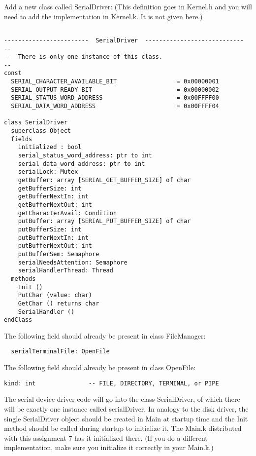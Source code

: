 \documentclass[11pt]{article}
\begin{document}
Add a new class called SerialDriver: (This definition goes in Kernel.h
and you will need to add the implementation in Kernel.k.  It is not
given here.)

\begin{verbatim}

------------------------  SerialDriver  ----------------------------
--
--  There is only one instance of this class.
--
const
  SERIAL_CHARACTER_AVAILABLE_BIT                 = 0x00000001
  SERIAL_OUTPUT_READY_BIT                        = 0x00000002
  SERIAL_STATUS_WORD_ADDRESS                     = 0x00FFFF00
  SERIAL_DATA_WORD_ADDRESS                       = 0x00FFFF04

class SerialDriver
  superclass Object
  fields
    initialized : bool
    serial_status_word_address: ptr to int
    serial_data_word_address: ptr to int
    serialLock: Mutex
    getBuffer: array [SERIAL_GET_BUFFER_SIZE] of char
    getBufferSize: int
    getBufferNextIn: int
    getBufferNextOut: int
    getCharacterAvail: Condition
    putBuffer: array [SERIAL_PUT_BUFFER_SIZE] of char
    putBufferSize: int
    putBufferNextIn: int
    putBufferNextOut: int
    putBufferSem: Semaphore
    serialNeedsAttention: Semaphore
    serialHandlerThread: Thread
  methods
    Init ()
    PutChar (value: char)
    GetChar () returns char
    SerialHandler ()
endClass
\end{verbatim}

The following field should already be present in class FileManager:

\begin{verbatim}
  serialTerminalFile: OpenFile
\end{verbatim}

The following field should already be present in class OpenFile:

\begin{verbatim}
kind: int               -- FILE, DIRECTORY, TERMINAL, or PIPE
\end{verbatim}

The serial device driver code will go into the class SerialDriver, of
which there will be exactly one instance called serialDriver.  In
analogy to the disk driver, the single SerialDriver object should be
created in Main at startup time and the Init method should be called
during startup to initialize it.  The Main.k distributed with this
assignment 7 has it initialized there.  (If you do a different
implementation, make sure you initialize it correctly in your Main.k.)
\end{document}
